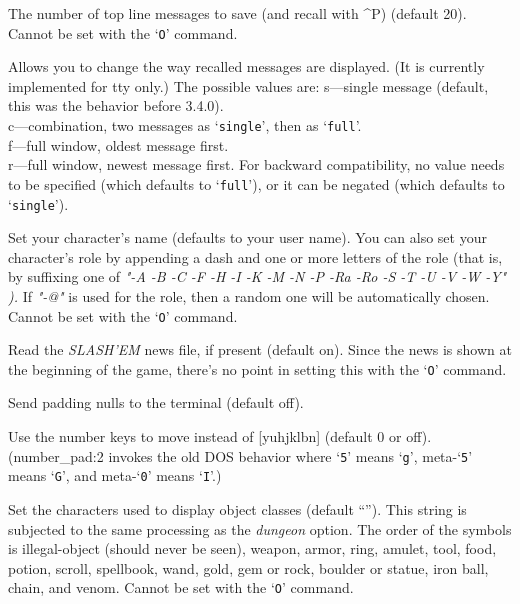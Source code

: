 \item[\ib{msghistory}]
The number of top line messages to save (and recall with \^{}P) (default 20).
Cannot be set with the `{\tt O}' command.

\item[\ib{msg\_window}]
Allows you to change the way recalled messages are displayed.
(It is currently implemented for tty only.)
The possible values are:
s---single message (default, this was the behavior before 3.4.0).\\
c---combination, two messages as `{\tt single}', then as `{\tt full}'.\\
f---full window, oldest message first.\\
r---full window, newest message first.
For backward compatibility, no value needs to be specified (which
defaults to `{\tt full}'), or it can be negated (which defaults to `{\tt single}').

\item[\ib{name}]
Set your character's name (defaults to your user name).  You can also
set your character's role by appending a dash and one or more letters of
the role (that is, by suffixing one of
{\it "-A -B -C -F -H -I -K -M -N -P -Ra -Ro -S -T -U -V -W -Y" ).\/} 
If
{\it "-@"\/} 
is used for the role, then a random one will be automatically chosen.
Cannot be set with the `{\tt O}' command.

\item[\ib{news}]
Read the {\it SLASH'EM\/} news file, if present (default on).
Since the news is shown at the beginning of the game, there's no point
in setting this with the `{\tt O}' command.

\item[\ib{null}]
Send padding nulls to the terminal (default off).

\item[\ib{number\_pad}]
Use the number keys to move instead of [yuhjklbn] (default 0 or off).
(number\_pad:2 invokes the old DOS behavior where `{\tt 5}' means `{\tt g}', meta-`{\tt 5}'
means `{\tt G}',  and meta-`{\tt 0}' means `{\tt I}'.)

\item[\ib{objects}]
Set the characters used to display object classes
(default ``\Symbol{])[="(\%!?+/\$*`0\_.}'').
This string is subjected to the same processing as the
{\it dungeon\/} 
option.
The order of the symbols is
illegal-object (should never be seen), weapon, armor, ring, amulet, tool,
food, potion, scroll, spellbook, wand, gold, gem or rock, boulder or statue,
iron ball, chain, and venom.
Cannot be set with the `{\tt O}' command.

